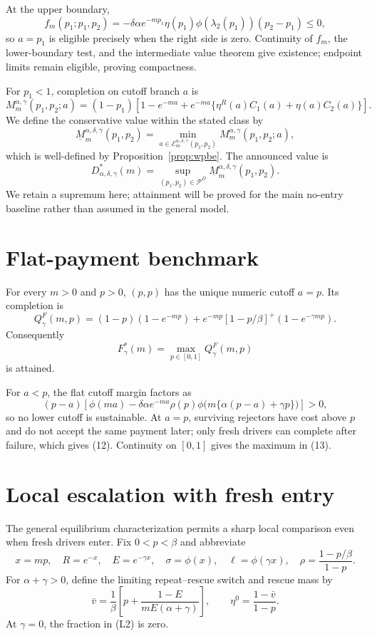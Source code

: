 \documentclass[mnsc,dblanonrev]{informs4}
\newcommand{\calE}{\mathcal E}
\newcommand{\ph}{\phi}
\begin{document}
At the upper boundary,
\[
 f_m(p_1;p_1,p_2)=
 -\delta\alpha e^{-mp_1}\eta(p_1)\ph(\lambda_2(p_1))(p_2-p_1)\le0,
\]
so $a=p_1$ is eligible precisely when the right side is zero.  Continuity of
$f_m$, the lower-boundary test, and the intermediate value theorem give
existence; endpoint limits remain eligible, proving compactness.

For $p_1<1$, completion on cutoff branch $a$ is
\[
 M_m^{\alpha,\gamma}(p_1,p_2;a)
 =(1-p_1)\left[1-e^{-ma}+e^{-ma}
 \{\eta^R(a)C_1(a)+\eta(a)C_2(a)\}\right].       \tag{9}
\]
We define the conservative value within the stated class by
\[
 \underline M_m^{\alpha,\delta,\gamma}(p_1,p_2)
 =\min_{a\in\calE_m^{\alpha,\delta,\gamma}(p_1,p_2)}
 M_m^{\alpha,\gamma}(p_1,p_2;a),                \tag{10}
\]
which is well-defined by Proposition~\ref{prop:wpbe}.  The announced value is
\[
 D_{\alpha,\delta,\gamma}^*(m)
 =\sup_{(p_1,p_2)\in\mathcal P^D}
 \underline M_m^{\alpha,\delta,\gamma}(p_1,p_2). \tag{11}
\]
We retain a supremum here; attainment will be proved for the main no-entry
baseline rather than assumed in the general model.

\section{Flat-payment benchmark}
\label{sec:flat}

\begin{proposition}
\label{prop:flat}
For every $m>0$ and $p>0$, $(p,p)$ has the unique numeric cutoff $a=p$.
Its completion is
\[
 Q^F_\gamma(m,p)
 =(1-p)(1-e^{-mp})
 +e^{-mp}[1-p/\beta]^+(1-e^{-\gamma mp}).        \tag{12}
\]
Consequently
\[
 F_\gamma^*(m)=\max_{p\in[0,1]}Q^F_\gamma(m,p)  \tag{13}
\]
is attained.
\end{proposition}

For $a<p$, the flat cutoff margin factors as
\[
 (p-a)\left[\ph(ma)-\delta\alpha e^{-ma}\rho(p)
 \ph\bigl(m\{\alpha(p-a)+\gamma p\}\bigr)\right]>0,
\]
so no lower cutoff is sustainable.  At $a=p$, surviving rejectors have cost
above $p$ and do not accept the same payment later; only fresh drivers can
complete after failure, which gives (12).  Continuity on $[0,1]$ gives the
maximum in (13).

\section{Local escalation with fresh entry}
\label{sec:localentry}

The general equilibrium characterization permits a sharp local comparison
even when fresh drivers enter.  Fix $0<p<\beta$ and abbreviate
\[
 x=mp,\quad R=e^{-x},\quad E=e^{-\gamma x},\quad
 \sigma=\ph(x),\quad \ell=\ph(\gamma x),\quad
 \rho=\frac{1-p/\beta}{1-p}.                               \tag{L1}
\]
For $\alpha+\gamma>0$, define the limiting repeat--rescue switch and rescue
mass by
\[
 \bar v=\frac1\beta\left[p+
  \frac{1-E}{mE(\alpha+\gamma)}\right],\qquad
 \eta^0=\frac{1-\bar v}{1-p}.                              \tag{L2}
\]
At $\gamma=0$, the fraction in (L2) is zero.
\end{document}
